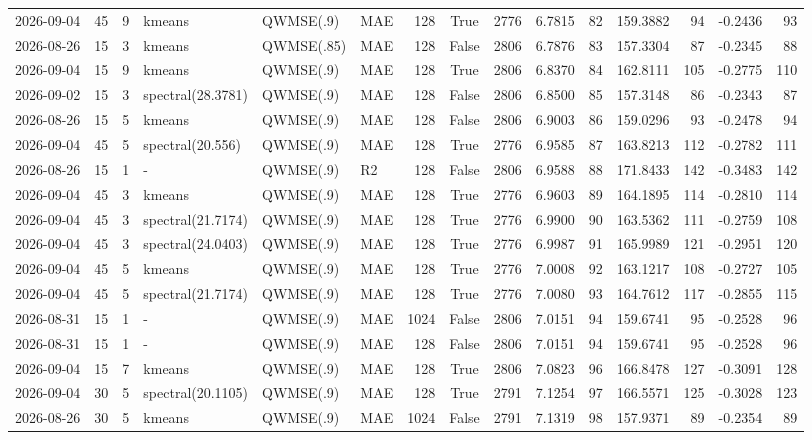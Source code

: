 \documentclass[10pt]{article}
\begin{document}
\begin{landscape}
\begin{longtable}{@{}lrrlllrcrrrrrrr@{}}
2026-09-04 & 45 & 9 & kmeans & QWMSE(.9) & MAE & 128 & True & 2776 & 6.7815 & 82 & 159.3882 & 94 & -0.2436 & 93 \\
2026-08-26 & 15 & 3 & kmeans & QWMSE(.85) & MAE & 128 & False & 2806 & 6.7876 & 83 & 157.3304 & 87 & -0.2345 & 88 \\
2026-09-04 & 15 & 9 & kmeans & QWMSE(.9) & MAE & 128 & True & 2806 & 6.8370 & 84 & 162.8111 & 105 & -0.2775 & 110 \\
2026-09-02 & 15 & 3 & spectral(28.3781) & QWMSE(.9) & MAE & 128 & False & 2806 & 6.8500 & 85 & 157.3148 & 86 & -0.2343 & 87 \\
2026-08-26 & 15 & 5 & kmeans & QWMSE(.9) & MAE & 128 & False & 2806 & 6.9003 & 86 & 159.0296 & 93 & -0.2478 & 94 \\
2026-09-04 & 45 & 5 & spectral(20.556) & QWMSE(.9) & MAE & 128 & True & 2776 & 6.9585 & 87 & 163.8213 & 112 & -0.2782 & 111 \\
2026-08-26 & 15 & 1 & - & QWMSE(.9) & R2 & 128 & False & 2806 & 6.9588 & 88 & 171.8433 & 142 & -0.3483 & 142 \\
2026-09-04 & 45 & 3 & kmeans & QWMSE(.9) & MAE & 128 & True & 2776 & 6.9603 & 89 & 164.1895 & 114 & -0.2810 & 114 \\
2026-09-04 & 45 & 3 & spectral(21.7174) & QWMSE(.9) & MAE & 128 & True & 2776 & 6.9900 & 90 & 163.5362 & 111 & -0.2759 & 108 \\
2026-09-04 & 45 & 3 & spectral(24.0403) & QWMSE(.9) & MAE & 128 & True & 2776 & 6.9987 & 91 & 165.9989 & 121 & -0.2951 & 120 \\
2026-09-04 & 45 & 5 & kmeans & QWMSE(.9) & MAE & 128 & True & 2776 & 7.0008 & 92 & 163.1217 & 108 & -0.2727 & 105 \\
2026-09-04 & 45 & 5 & spectral(21.7174) & QWMSE(.9) & MAE & 128 & True & 2776 & 7.0080 & 93 & 164.7612 & 117 & -0.2855 & 115 \\
2026-08-31 & 15 & 1 & - & QWMSE(.9) & MAE & 1024 & False & 2806 & 7.0151 & 94 & 159.6741 & 95 & -0.2528 & 96 \\
2026-08-31 & 15 & 1 & - & QWMSE(.9) & MAE & 128 & False & 2806 & 7.0151 & 94 & 159.6741 & 95 & -0.2528 & 96 \\
2026-09-04 & 15 & 7 & kmeans & QWMSE(.9) & MAE & 128 & True & 2806 & 7.0823 & 96 & 166.8478 & 127 & -0.3091 & 128 \\
2026-09-04 & 30 & 5 & spectral(20.1105) & QWMSE(.9) & MAE & 128 & True & 2791 & 7.1254 & 97 & 166.5571 & 125 & -0.3028 & 123 \\
2026-08-26 & 30 & 5 & kmeans & QWMSE(.9) & MAE & 1024 & False & 2791 & 7.1319 & 98 & 157.9371 & 89 & -0.2354 & 89 \\

\end{longtable}
\end{landscape}
\end{document}
